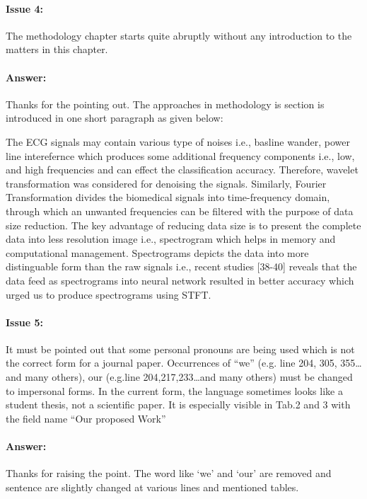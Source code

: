 \documentclass{article}
\begin{document}
\paragraph{Issue 4:}
\begin{displayquote}
The methodology chapter starts quite abruptly without any introduction to the matters in this chapter.
\end{displayquote}

\paragraph{Answer:}
Thanks for the pointing out. The approaches in methodology is section is introduced in one short paragraph as given below:

The ECG signals may contain various type of noises i.e., basline wander, power line interefernce which produces some additional frequency components i.e., low, and high frequencies and can effect the classification accuracy. Therefore, wavelet transformation was considered for denoising the signals. Similarly, Fourier Transformation divides the biomedical signals into time-frequency domain, through which an unwanted frequencies can be filtered with the purpose of data size reduction. The key advantage of reducing data size is to present the complete data into less resolution image i.e., spectrogram which helps in memory and computational management. Spectrograms depicts the data into more distinguable form than the raw signals i.e., recent studies [38-40] reveals that the data feed as spectrograms into neural network resulted in better accuracy which urged us to produce spectrograms using STFT. 
 
\paragraph{Issue 5:}
\begin{displayquote}
It must be pointed out that some personal pronouns are being used which is not the correct form for a journal paper. Occurrences of “we” (e.g. line 204, 305, 355…and many others), our (e.g.line 204,217,233…and many others) must be changed to impersonal forms.  In the current form, the language sometimes looks like a student thesis, not a scientific paper. It is especially visible in Tab.2 and 3 with the field name “Our proposed Work”
\end{displayquote}

\paragraph{Answer:}
Thanks for raising the point. The word like `we' and `our' are removed and sentence are slightly changed at various lines and mentioned tables. 
\end{document}
